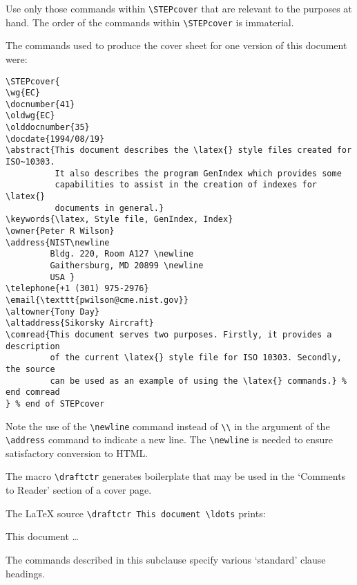 \documentclass[wd,copyright,letterpaper]{isov2}
\makeatletter
\newcommand{\bs}{\symbol{'134}}
\newcommand{\ixcom}[1]{\index{#1/ @{\tt \protect\bs #1}}}
\newcommand{\latex}{LaTeX}
\makeatother
\begin{document}
    Use only those commands within \verb|\STEPcover| that are relevant 
to the purposes at hand. The order of the commands within 
\verb|\STEPcover| is immaterial.

\begin{example}
The commands used to produce the cover sheet for one version of this 
document were:
\begin{verbatim}
\STEPcover{
\wg{EC}
\docnumber{41}
\oldwg{EC}
\olddocnumber{35}
\docdate{1994/08/19}
\abstract{This document describes the \latex{} style files created for ISO~10303.
          It also describes the program GenIndex which provides some 
          capabilities to assist in the creation of indexes for \latex{}
          documents in general.}
\keywords{\latex, Style file, GenIndex, Index}
\owner{Peter R Wilson}
\address{NIST\newline
         Bldg. 220, Room A127 \newline
         Gaithersburg, MD 20899 \newline
         USA }
\telephone{+1 (301) 975-2976}
\email{\texttt{pwilson@cme.nist.gov}}
\altowner{Tony Day}
\altaddress{Sikorsky Aircraft}
\comread{This document serves two purposes. Firstly, it provides a description
         of the current \latex{} style file for ISO 10303. Secondly, the source
         can be used as an example of using the \latex{} commands.} % end comread
} % end of STEPcover
\end{verbatim}
Note the use of the \verb|\newline| command instead of \verb|\\| in 
the argument of the \verb|\address| command to indicate a new line. The
\verb|\newline| is needed to ensure satisfactory conversion to HTML.
\end{example} %

    The macro \verb|\draftctr|\ixcom{draftctr} generates boilerplate that
may be used in the `Comments to Reader' section of a cover page.
\begin{example}
The \latex{} source \verb|\draftctr This document \ldots| prints:

\draftctr This document \ldots
\end{example}


    The commands described in this subclause specify various `standard'
clause headings.

\end{document}
